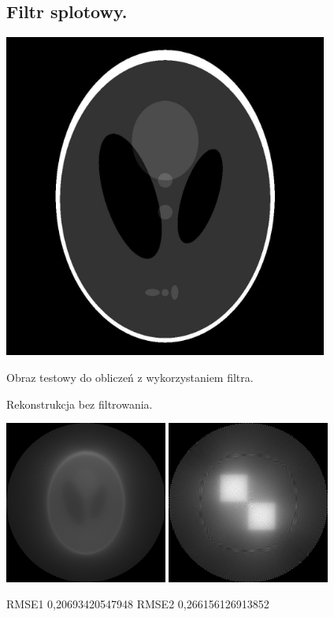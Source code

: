 \documentclass[a4paper, 11pt]{article}
\begin{document}
\subsection{Filtr splotowy.}
\begin{center}
	\includegraphics[width=0.8\textwidth]{phantom.png}


	Obraz testowy do obliczeń z wykorzystaniem filtra.
\end{center}

\begin{center}
	Rekonstrukcja bez filtrowania.


	\includegraphics[width=0.4\textwidth]{reconstructed1.png}
	\includegraphics[width=0.4\textwidth]{reconstructed2.png}

	RMSE1 0,20693420547948 \hspace{1.5cm} RMSE2 0,266156126913852

\end{center}
\end{document}
